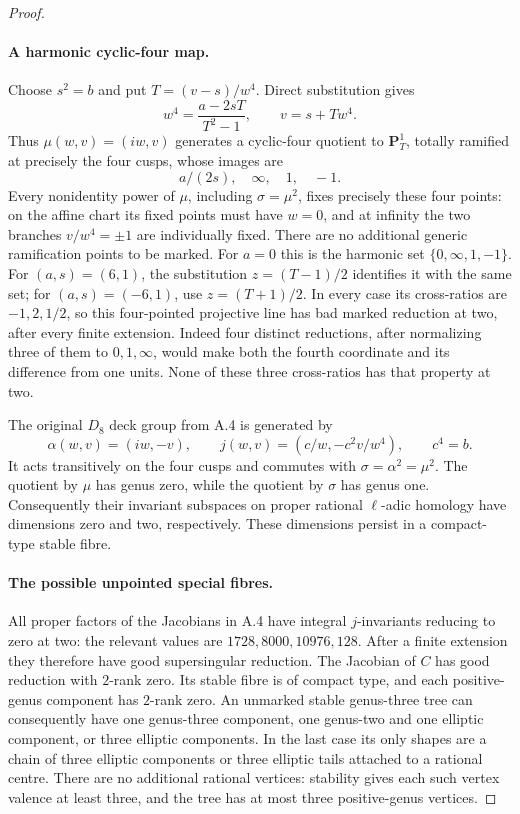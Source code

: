 \begin{proof}
\paragraph{A harmonic cyclic-four map.}
Choose \(s^2=b\) and put \(T=(v-s)/w^4\). Direct substitution gives
\[
 w^4=\frac{a-2sT}{T^2-1},\qquad v=s+Tw^4.               \tag{A.37.2}
\]
Thus \(\mu(w,v)=(iw,v)\) generates a cyclic-four quotient
to \(\mathbf P^1_T\), totally ramified at precisely the four
cusps, whose images are
\[
                 a/(2s),\quad\infty,\quad 1,\quad-1.
                                                               \tag{A.37.3}
\]
Every nonidentity power of \(\mu\), including
\(\sigma=\mu^2\), fixes precisely these four points:
on the affine chart its fixed points must have \(w=0\),
and at infinity the two branches \(v/w^4=\pm1\)
are individually fixed. There are no additional generic
ramification points to be marked.
For \(a=0\) this is the harmonic set \(\{0,\infty,1,-1\}\).
For \((a,s)=(6,1)\), the substitution \(z=(T-1)/2\)
identifies it with the same set; for \((a,s)=(-6,1)\), use
\(z=(T+1)/2\). In every case its cross-ratios are
\(-1,2,1/2\), so this four-pointed projective line has bad
marked reduction at two, after every finite extension.
Indeed four distinct reductions, after normalizing three
of them to \(0,1,\infty\), would make both the fourth
coordinate and its difference from one units. None of
these three cross-ratios has that property at two.

The original \(D_8\) deck group from A.4 is generated by
\[
 \alpha(w,v)=(iw,-v),\qquad
 j(w,v)=(c/w,-c^2v/w^4),\qquad c^4=b.
\]
It acts transitively on the four cusps and commutes with
\(\sigma=\alpha^2=\mu^2\). The quotient by \(\mu\) has
genus zero, while the quotient by \(\sigma\) has genus one.
Consequently their invariant subspaces on proper rational
\(\ell\)-adic homology have dimensions zero and two,
respectively. These dimensions persist in a compact-type
stable fibre.

\paragraph{The possible unpointed special fibres.}
All proper factors of the Jacobians in A.4 have integral
\(j\)-invariants reducing to zero at two: the relevant values
are \(1728,8000,10976,128\). After a finite extension they
therefore have good supersingular reduction. The Jacobian of
\(C\) has good reduction with \(2\)-rank zero. Its stable
fibre is of compact type, and each positive-genus component
has \(2\)-rank zero. An unmarked stable genus-three tree
can consequently have one genus-three component, one
genus-two and one elliptic component, or three elliptic
components. In the last case its only shapes are a chain
of three elliptic components or three elliptic tails
attached to a rational centre. There are no additional
rational vertices: stability gives each such vertex
valence at least three, and the tree has at most three
positive-genus vertices.


\end{proof}
